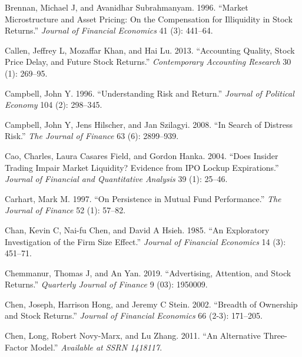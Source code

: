 \documentclass[
  letterpaper,
  DIV=11,
  numbers=noendperiod]{scrreprt}
\newlength{\cslhangindent}
\newlength{\cslentryspacingunit} %
\newenvironment{CSLReferences}[2] %
 {%
  \setlength{\parindent}{0pt}
  \ifodd #1
  \let\oldpar\par
  \def\par{\hangindent=\cslhangindent\oldpar}
  \fi
  \setlength{\parskip}{#2\cslentryspacingunit}
 }%
 {}
\begin{document}
\begin{CSLReferences}{1}{0}
\leavevmode{}%
Brennan, Michael J, and Avanidhar Subrahmanyam. 1996. {``Market
Microstructure and Asset Pricing: On the Compensation for Illiquidity in
Stock Returns.''} \emph{Journal of Financial Economics} 41 (3): 441--64.

\leavevmode{}%
Callen, Jeffrey L, Mozaffar Khan, and Hai Lu. 2013. {``Accounting
Quality, Stock Price Delay, and Future Stock Returns.''}
\emph{Contemporary Accounting Research} 30 (1): 269--95.

\leavevmode{}%
Campbell, John Y. 1996. {``Understanding Risk and Return.''}
\emph{Journal of Political Economy} 104 (2): 298--345.

\leavevmode{}%
Campbell, John Y, Jens Hilscher, and Jan Szilagyi. 2008. {``In Search of
Distress Risk.''} \emph{The Journal of Finance} 63 (6): 2899--939.

\leavevmode{}%
Cao, Charles, Laura Casares Field, and Gordon Hanka. 2004. {``Does
Insider Trading Impair Market Liquidity? Evidence from IPO Lockup
Expirations.''} \emph{Journal of Financial and Quantitative Analysis} 39
(1): 25--46.

\leavevmode{}%
Carhart, Mark M. 1997. {``On Persistence in Mutual Fund Performance.''}
\emph{The Journal of Finance} 52 (1): 57--82.

\leavevmode{}%
Chan, Kevin C, Nai-fu Chen, and David A Hsieh. 1985. {``An Exploratory
Investigation of the Firm Size Effect.''} \emph{Journal of Financial
Economics} 14 (3): 451--71.

\leavevmode{}%
Chemmanur, Thomas J, and An Yan. 2019. {``Advertising, Attention, and
Stock Returns.''} \emph{Quarterly Journal of Finance} 9 (03): 1950009.

\leavevmode{}%
Chen, Joseph, Harrison Hong, and Jeremy C Stein. 2002. {``Breadth of
Ownership and Stock Returns.''} \emph{Journal of Financial Economics} 66
(2-3): 171--205.

\leavevmode{}%
Chen, Long, Robert Novy-Marx, and Lu Zhang. 2011. {``An Alternative
Three-Factor Model.''} \emph{Available at SSRN 1418117}.


\end{CSLReferences}
\end{document}
